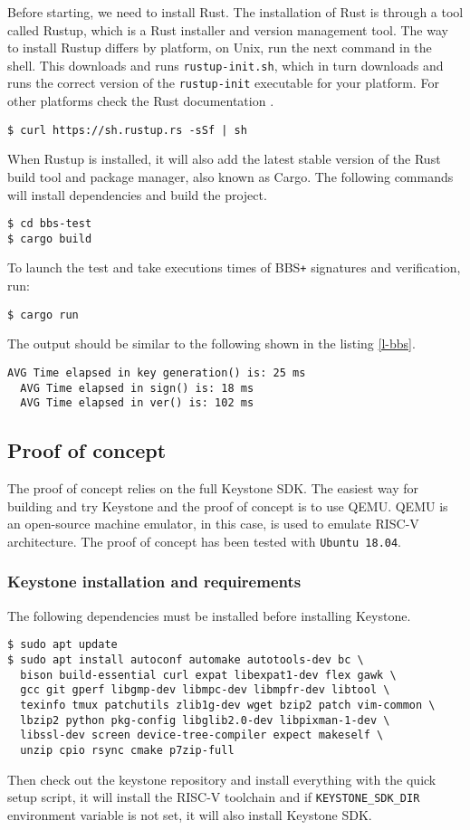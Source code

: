 Before starting, we need to install Rust. The installation of Rust is through a tool called Rustup, which is a Rust installer and version management tool. The way to install Rustup differs by platform, on Unix, run the next command in the shell. This downloads and runs \texttt{rustup-init.sh}, which in turn downloads and runs the correct version of the \texttt{rustup-init} executable for your platform. For other platforms check the Rust documentation \cite{rust-install}. 
\begin{lstlisting}[frame=single]
$ curl https://sh.rustup.rs -sSf | sh
\end{lstlisting}
When Rustup is installed, it will also add the latest stable version of the Rust build tool and package manager, also known as Cargo. The following commands will install dependencies and build the project. 
\begin{lstlisting}[frame=single]
$ cd bbs-test
$ cargo build
\end{lstlisting}
To launch the test and take executions times of BBS\texttt{+} signatures and verification, run:  
\begin{lstlisting}[frame=single]
$ cargo run
\end{lstlisting}

The output should be similar to the following shown in the listing \ref{l-bbs}. 
\begin{lstlisting}[caption={Example of BBS\texttt{+} tests output},captionpos=b,label={l-bbs},style=DOS,frame=single]
  AVG Time elapsed in key generation() is: 25 ms
  AVG Time elapsed in sign() is: 18 ms
  AVG Time elapsed in ver() is: 102 ms
\end{lstlisting}

\subsection{Proof of concept}

The proof of concept relies on the full Keystone SDK. The easiest way for building and try Keystone and the proof of concept is to use QEMU. QEMU is an open-source machine emulator, in this case, is used to emulate RISC-V architecture.
The proof of concept has been tested with \texttt{Ubuntu 18.04}. 
\subsubsection{Keystone installation and requirements}
The following dependencies must be installed before installing Keystone.
\begin{lstlisting}[frame=single]
$ sudo apt update
$ sudo apt install autoconf automake autotools-dev bc \
  bison build-essential curl expat libexpat1-dev flex gawk \ 
  gcc git gperf libgmp-dev libmpc-dev libmpfr-dev libtool \ 
  texinfo tmux patchutils zlib1g-dev wget bzip2 patch vim-common \
  lbzip2 python pkg-config libglib2.0-dev libpixman-1-dev \
  libssl-dev screen device-tree-compiler expect makeself \
  unzip cpio rsync cmake p7zip-full
\end{lstlisting}
Then check out the keystone repository and install everything with the quick setup script, it will install the RISC-V toolchain and if \texttt{KEYSTONE\_SDK\_DIR} environment variable is not set, it will also install Keystone SDK. 

